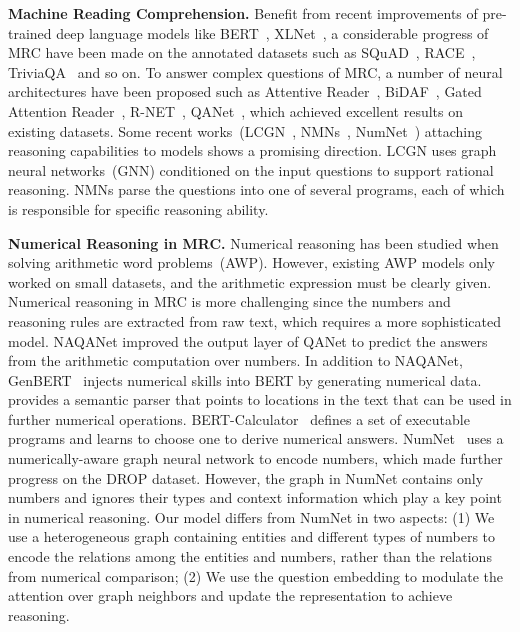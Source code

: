 \documentclass{article}
\begin{document}
{\bf Machine Reading Comprehension.}
Benefit from recent improvements of pre-trained deep language models like BERT~\cite{devlin-etal-2019-bert}, XLNet~\cite{yang2019xlnet}, a considerable progress of MRC have been made on the annotated datasets such as SQuAD~\cite{rajpurkar-etal-2016-squad}, RACE~\cite{lai-etal-2017-race}, TriviaQA~\cite{JoshiTriviaQA2017} and so on. 
To answer complex questions of MRC, a number of neural architectures have been proposed such as Attentive Reader~\cite{hermann2015teaching}, BiDAF~\cite{Seo2017Bidirectional}, Gated Attention Reader~\cite{dhingra-etal-2017-gated}, R-NET~\cite{wang2017rnet}, QANet~\cite{wei2018qanet}, which achieved excellent results on existing datasets.
Some recent works~(LCGN~\cite{hu2019lcgn}, NMNs~\cite{gupta2020nms}, NumNet~\cite{DBLP:conf/emnlp/RanLLZL19}) attaching reasoning capabilities to models shows a promising direction. LCGN uses graph neural networks~(GNN) conditioned on the input questions to support rational reasoning. NMNs parse the questions into one of several programs, each of which is responsible for specific reasoning ability.

{\bf Numerical Reasoning in MRC.}
Numerical reasoning has been studied when solving arithmetic word problems~(AWP). However, existing AWP models only worked on small datasets, and the arithmetic expression must be clearly given. Numerical reasoning in MRC is more challenging since the numbers and reasoning rules are extracted from raw text, which requires a more sophisticated model.
NAQANet improved the output layer of QANet to predict the answers from the arithmetic computation over numbers. 
In addition to NAQANet, GenBERT~\cite{ggb2020injecting} injects numerical skills into BERT by generating numerical data.
~\cite{DBLP:conf/iclr/ChenLYZSL20} provides a semantic parser that points to locations in the text that can be used in further numerical operations.
BERT-Calculator~\cite{DBLP:conf/emnlp/AndorHLP19} defines a set of executable programs and learns to choose one to derive numerical answers. 
NumNet~\cite{DBLP:conf/emnlp/RanLLZL19} uses a numerically-aware graph neural network to encode numbers, which made further progress on the DROP dataset.
However, the graph in NumNet contains only numbers and ignores their types and context information which play a key point in numerical reasoning. 
Our model differs from NumNet in two aspects: (1) We use a heterogeneous graph containing entities and different types of numbers to encode the relations among the entities and numbers, rather than the relations from numerical comparison; (2) We use the question embedding to modulate the attention over graph neighbors and update the representation to achieve reasoning.
\end{document}
